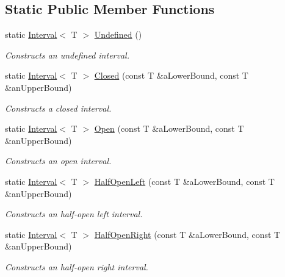 \subsection*{Static Public Member Functions}
\begin{DoxyCompactItemize}
\item 
static \hyperlink{classostk_1_1math_1_1obj_1_1_interval}{Interval}$<$ T $>$ \hyperlink{classostk_1_1math_1_1obj_1_1_interval_a34149197805573678f6ed5d29679be88}{Undefined} ()
\begin{DoxyCompactList}\small\item\em Constructs an undefined interval. \end{DoxyCompactList}\item 
static \hyperlink{classostk_1_1math_1_1obj_1_1_interval}{Interval}$<$ T $>$ \hyperlink{classostk_1_1math_1_1obj_1_1_interval_a48e9f436e8994c49026a1ecd503bc190}{Closed} (const T \&a\+Lower\+Bound, const T \&an\+Upper\+Bound)
\begin{DoxyCompactList}\small\item\em Constructs a closed interval. \end{DoxyCompactList}\item 
static \hyperlink{classostk_1_1math_1_1obj_1_1_interval}{Interval}$<$ T $>$ \hyperlink{classostk_1_1math_1_1obj_1_1_interval_ac80686dee5b2893e7b74a5120340db99}{Open} (const T \&a\+Lower\+Bound, const T \&an\+Upper\+Bound)
\begin{DoxyCompactList}\small\item\em Constructs an open interval. \end{DoxyCompactList}\item 
static \hyperlink{classostk_1_1math_1_1obj_1_1_interval}{Interval}$<$ T $>$ \hyperlink{classostk_1_1math_1_1obj_1_1_interval_a47bfd73591e68d8c1c7ff1fd626cbf5b}{Half\+Open\+Left} (const T \&a\+Lower\+Bound, const T \&an\+Upper\+Bound)
\begin{DoxyCompactList}\small\item\em Constructs an half-\/open left interval. \end{DoxyCompactList}\item 
static \hyperlink{classostk_1_1math_1_1obj_1_1_interval}{Interval}$<$ T $>$ \hyperlink{classostk_1_1math_1_1obj_1_1_interval_abe98617b87988bf157703cbd04bb1905}{Half\+Open\+Right} (const T \&a\+Lower\+Bound, const T \&an\+Upper\+Bound)
\begin{DoxyCompactList}\small\item\em Constructs an half-\/open right interval. \end{DoxyCompactList}\item 

\end{DoxyCompactItemize}
